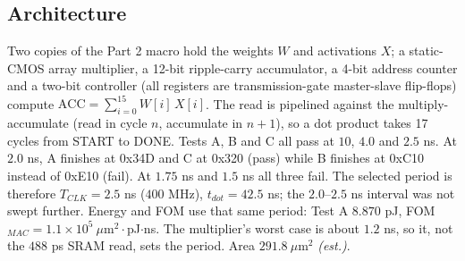 \documentclass[10pt,letterpaper]{article}
\newcommand{\est}{\textit{(est.)}}
\begin{document}
\subsection{Architecture}\label{sec:arch}
Two copies of the Part 2 macro hold the weights $W$ and activations $X$; a static-CMOS array multiplier, a 12-bit ripple-carry accumulator, a 4-bit address counter and a two-bit controller (all registers are transmission-gate master-slave flip-flops) compute $\mathrm{ACC}=\sum_{i=0}^{15}W[i]\,X[i]$. The read is pipelined against the multiply-accumulate (read in cycle $n$, accumulate in $n+1$), so a dot product takes 17 cycles from START to DONE. Tests A, B and C all pass at $10$, $4.0$ and $2.5$ ns. At $2.0$ ns, A finishes at 0x34D and C at 0x320 (pass) while B finishes at 0xC10 instead of 0xE10 (fail). At $1.75$ ns and $1.5$ ns all three fail. The selected period is therefore $T_{CLK}=2.5$ ns ($400$ MHz), $t_{dot}=42.5$ ns; the $2.0$--$2.5$ ns interval was not swept further. Energy and FOM use that same period: Test A $8.870$ pJ, FOM$_{MAC}=1.1\times10^{5}\ \mu$m$^2\cdot$pJ$\cdot$ns. The multiplier's worst case is about $1.2$ ns, so it, not the $488$ ps SRAM read, sets the period. Area $291.8\ \mu$m$^2$ \est.
\end{document}

